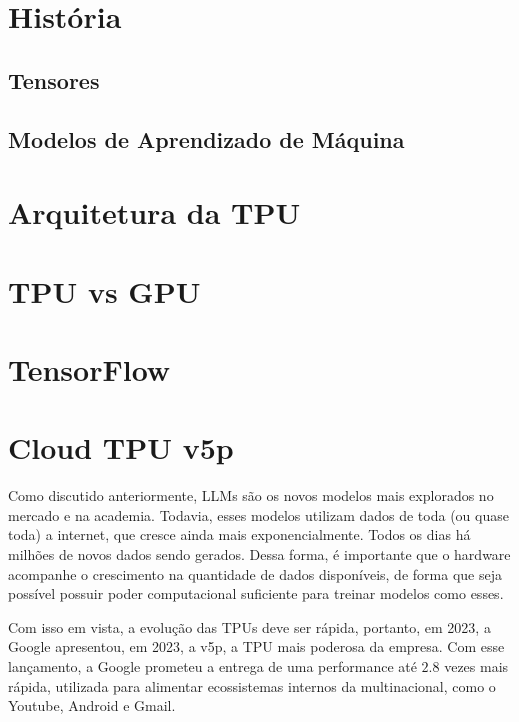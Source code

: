 \documentclass{report}
\begin{document}
\chapter{História}

\section{Tensores}

\section{Modelos de Aprendizado de Máquina}

\chapter{Arquitetura da TPU}

\chapter{TPU vs GPU}

\chapter{TensorFlow}

\chapter{Cloud TPU v5p}

Como discutido anteriormente, LLMs são os novos modelos mais explorados no mercado e na academia. Todavia, esses modelos utilizam dados de toda (ou quase toda) a internet, que cresce ainda mais exponencialmente. Todos os dias há milhões de novos dados sendo gerados. Dessa forma, é importante que o hardware acompanhe o crescimento na quantidade de dados disponíveis, de forma que seja possível possuir poder computacional suficiente para treinar modelos como esses.

Com isso em vista, a evolução das TPUs deve ser rápida, portanto, em 2023, a Google apresentou, em 2023, a v5p, a TPU mais poderosa da empresa. Com esse lançamento, a Google prometeu a entrega de uma performance até $2.8$ vezes mais rápida, utilizada para alimentar ecossistemas internos da multinacional, como o Youtube, Android e Gmail.
\end{document}
